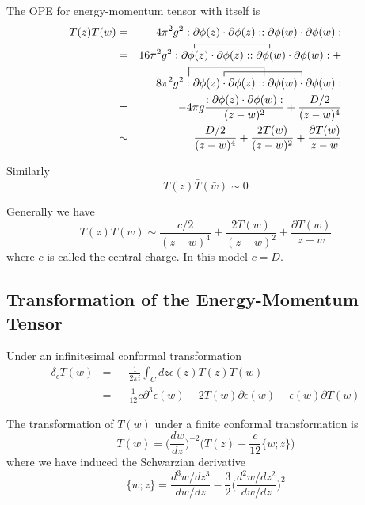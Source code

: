 \documentclass[12pt]{book}
\begin{document}
	The OPE for energy-momentum tensor with itself is
	\begin{eqnarray}
		T(z)T(w)&=&4\pi^2g^2:\partial\phi(z)\cdot\partial\phi(z)::\partial\phi(w)\cdot\partial\phi(w):\\
		\contraction{\quad=16\pi^2g^2:\partial}{\phi}{(z)\cdot\partial\phi(z)::\partial}{\phi}
		&=&16\pi^2g^2:\partial\phi(z)\cdot\partial\phi(z)::\partial\phi(w)\cdot\partial\phi(w):+\\
		\contraction[2ex]{\quad =8\pi^2g^2:\partial}{\phi}{(z)\cdot\partial\phi(z)::\partial}{\phi}
		\contraction{\quad =8\pi^2g^2:\partial\phi(z)\cdot\partial}{\phi}{(z)::\partial\phi(w)\cdot\partial}{\phi}
		&&8\pi^2g^2:\partial\phi(z)\cdot\partial\phi(z)::\partial\phi(w)\cdot\partial\phi(w):\\
		&=&-4\pi g\frac{:\partial\phi(z)\cdot\partial\phi(w):}{(z-w)^2}+\frac{D/2}{(z-w)^4}\\
		&\sim&\frac{D/2}{(z-w)^4}+\frac{2T(w)}{(z-w)^2}+\frac{\partial T(w)}{z-w}
	\end{eqnarray}
	
	Similarly
	\begin{equation}
		T(z)\bar T(\bar w)\sim 0
	\end{equation}
	
	Generally we have
	\begin{equation}
		T(z)T(w)\sim \frac{c/2}{(z-w)^4}+\frac{2T(w)}{(z-w)^2}+\frac{\partial T(w)}{z-w}
	\end{equation}
	where $c$ is called the central charge. In this model $c=D$.
	\subsection{Transformation of the Energy-Momentum Tensor}
	
	Under an infinitesimal conformal transformation
	\begin{eqnarray}
		\delta_\epsilon T(w)&=&-\frac1{2\pi i}\int_C dz\epsilon(z)T(z)T(w)\\
		&=&-\frac 1{12}c\partial^3\epsilon(w)-2T(w)\partial\epsilon(w)-\epsilon(w)\partial T(w)
	\end{eqnarray}
	
	The transformation of $T(w)$ under a finite  conformal transformation is
	\begin{equation}
		T(w)=\Big(\frac{dw}{dz}\Big)^{-2}\big(T(z)-\frac c{12}\{w;z\}\big)
	\end{equation}
	where we have induced the Schwarzian derivative
	\begin{equation}
		\{w;z\}=\frac{d^3w/dz^3}{dw/dz}-\frac 32\Big(\frac{d^2w/dz^2}{dw/dz}\Big)^2
	\end{equation}
	
\end{document}

